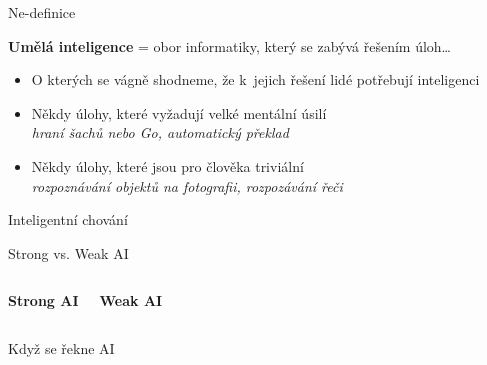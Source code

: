 \documentclass[aspectratio=169,dvipsnames,handout]{beamer}
\begin{document}
\begin{frame}{Ne-definice}

    \begin{center}
        \large
    \textbf{Umělá inteligence} = obor informatiky, který se zabývá řešením
    úloh\ldots
    \end{center}

    \begin{itemize}[<+->]

        \item O kterých se vágně shodneme, že k~jejich řešení lidé potřebují
            inteligenci

        \item Někdy úlohy, které vyžadují velké mentální úsilí \\
            \quad \emph{hraní šachů nebo Go, automatický překlad}

        \item Někdy úlohy, které jsou pro člověka triviální \\
            \quad \emph{rozpoznávání objektů na fotografii, rozpozávání řeči}

    \end{itemize}

\end{frame}


\begin{frame}{Inteligentní chování}
\end{frame}


\begin{frame}{Strong vs. Weak AI}

    \begin{columns}
        \textbf{Strong AI}



        \textbf{Weak AI}
    \end{columns}


\end{frame}

\begin{frame}{Když se řekne AI}

\end{frame}
\end{document}
